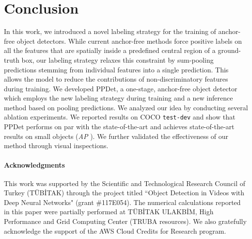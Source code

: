 \documentclass{bmvc2k}
\begin{document}
\section{Conclusion}
In this work, we introduced a novel labeling strategy for the training of anchor-free object detectors. While current anchor-free methods force positive labels on all the features that are  spatially inside a predefined central region of a ground-truth box, our labeling strategy relaxes this constraint by sum-pooling predictions stemming from individual features into a single prediction. This allows the model to reduce the contributions of non-discriminatory features during training. We developed PPDet, a one-stage, anchor-free object detector which employs the new labeling strategy during training and a new inference method based on pooling predictions. We analyzed our idea by conducting several ablation experiments. We reported results on COCO \texttt{test-dev} and show that PPDet performs on par with the state-of-the-art and achieves state-of-the-art results on small objects (\textit{AP} ). We further validated the effectiveness of our method through visual inspections.  
 






\paragraph*{\textbf{Acknowledgments}}
This work was supported by the Scientific and Technological Research Council of Turkey (T\"{U}B\.{I}TAK) through the project titled ``Object Detection in Videos with Deep Neural Networks" (grant \#117E054). The numerical calculations reported in this paper were partially performed at T\"{U}B\.{I}TAK ULAKB\.{I}M, High Performance and Grid Computing Center (TRUBA resources). We also gratefully acknowledge the support of the AWS Cloud Credits for Research program.








{ \small

 }
\end{document}

